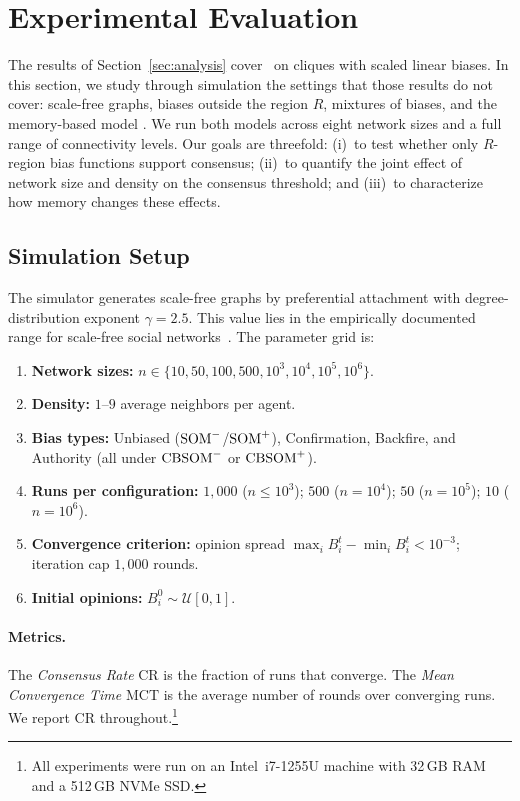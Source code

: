 \section{Experimental Evaluation}
\label{sec:experiments}

The results of Section~\ref{sec:analysis} cover \CBSOMminus\ on cliques
with scaled linear biases. In this section, we study through simulation
the settings that those results do not cover: scale-free graphs,
biases outside the region $R$, mixtures of biases, and the memory-based
model \CBSOMplus. We run both models across eight network sizes and a
full range of connectivity levels. Our goals are threefold:
(i)~to test whether only $R$-region bias functions support consensus;
(ii)~to quantify the joint effect of network size and density on the
consensus threshold; and (iii)~to characterize how memory changes these
effects.

\subsection{Simulation Setup}
\label{sec:exp-setup}

The simulator generates scale-free graphs by preferential attachment
with degree-distribution exponent $\gamma=2.5$. This value lies in the
empirically documented range for scale-free social
networks~\cite{Barabasi1999,Newman2003,Clauset2009}.
The parameter grid is:
\begin{enumerate}
  \item \textbf{Network sizes:}
        $n \in \{10, 50, 100, 500, 10^3, 10^4, 10^5, 10^6\}$.
  \item \textbf{Density:} $1$--$9$ average neighbors per agent.
  \item \textbf{Bias types:} Unbiased ($\mathrm{SOM}^{-}$/$\mathrm{SOM}^{+}$),
        Confirmation, Backfire, and Authority
        (all under $\mathrm{CBSOM}^{-}$ or $\mathrm{CBSOM}^{+}$).
  \item \textbf{Runs per configuration:}
        $1{,}000$ ($n \le 10^3$); $500$ ($n=10^4$);
        $50$ ($n=10^5$); $10$ ($n=10^6$).
  \item \textbf{Convergence criterion:}
        opinion spread $\max_i B_i^t - \min_i B_i^t < 10^{-3}$;
        iteration cap $1{,}000$ rounds.
  \item \textbf{Initial opinions:} $B_i^0\sim\mathcal{U}[0,1]$.
\end{enumerate}

\paragraph{Metrics.}
The \emph{Consensus Rate} $\mathrm{CR}$
is the fraction of runs that converge. The
\emph{Mean Convergence Time} $\mathrm{MCT}$ is the average number of
rounds over converging runs. We report $\mathrm{CR}$ throughout.\footnote{All experiments were run on an Intel~i7-1255U machine with 32\,GB RAM and a 512\,GB NVMe SSD.}

